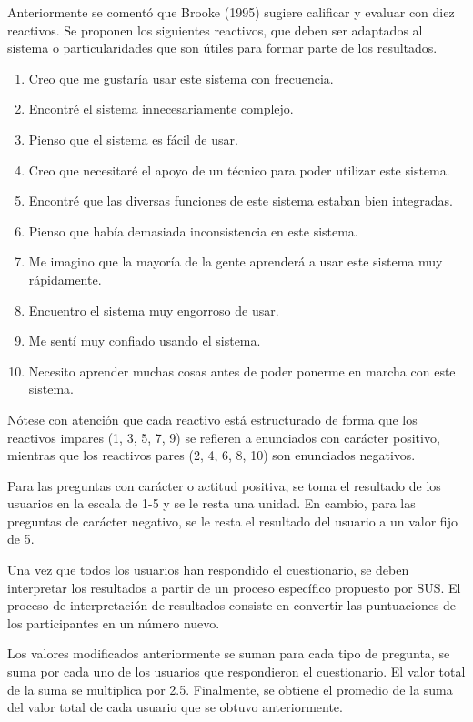 Anteriormente se comentó que Brooke (1995) sugiere calificar y evaluar con diez reactivos. Se proponen los siguientes reactivos, que deben ser adaptados al sistema o particularidades que son útiles para formar parte de los resultados.

\begin{enumerate}
  \item Creo que me gustaría usar este sistema con frecuencia.
  \item Encontré el sistema innecesariamente complejo.
  \item Pienso que el sistema es fácil de usar.
  \item Creo que necesitaré el apoyo de un técnico para poder utilizar este sistema.
  \item Encontré que las diversas funciones de este sistema estaban bien integradas.
  \item Pienso que había demasiada inconsistencia en este sistema.
  \item Me imagino que la mayoría de la gente aprenderá a usar este sistema muy rápidamente.
  \item Encuentro el sistema muy engorroso de usar.
  \item Me sentí muy confiado usando el sistema.
  \item Necesito aprender muchas cosas antes de poder ponerme en marcha con este sistema.
\end{enumerate}

Nótese con atención que cada reactivo está estructurado de forma que los reactivos impares (1, 3, 5, 7, 9) se refieren a enunciados con carácter positivo, mientras que los reactivos pares (2, 4, 6, 8, 10) son enunciados negativos.

Para las preguntas con carácter o actitud positiva, se toma el resultado de los usuarios en la escala de 1-5 y se le resta una unidad. En cambio, para las preguntas de carácter negativo, se le resta el resultado del usuario a un valor fijo de 5.

Una vez que todos los usuarios han respondido el cuestionario, se deben interpretar los resultados a partir de un proceso específico propuesto por SUS. El proceso de interpretación de resultados consiste en convertir las puntuaciones de los participantes en un número nuevo.

Los valores modificados anteriormente se suman para cada tipo de pregunta, se suma por cada uno de los usuarios que respondieron el cuestionario. El valor total de la suma se multiplica por 2.5. Finalmente, se obtiene el promedio de la suma del valor total de cada usuario que se obtuvo anteriormente.

